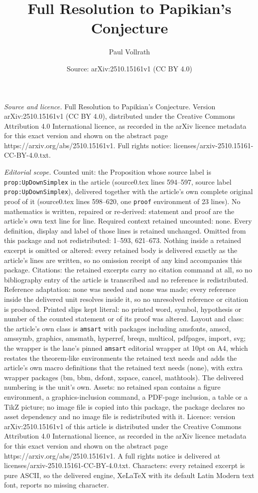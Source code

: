 \documentclass[10pt,a4paper]{amsart}
\title[Full Resolution to Papikian's Conjecture]{Full Resolution to Papikian's Conjecture}
\author{Paul Vollrath}
\date{Source: arXiv:2510.15161v1 (CC BY 4.0)}
\begin{document}
\maketitle

\noindent\emph{Source and licence.} Full Resolution to Papikian's Conjecture. Version arXiv:2510.15161v1 (CC BY 4.0), distributed under the Creative Commons Attribution 4.0 International licence, as recorded in the arXiv licence metadata for this exact version and shown on the abstract page https://arxiv.org/abs/2510.15161v1. Full rights notice: licenses/arxiv-2510.15161-CC-BY-4.0.txt.\par\smallskip

\noindent\textit{Editorial scope.} Counted unit: the Proposition whose source label is \texttt{prop:UpDownSimplex} in the article (source0.tex lines 594--597, source label \texttt{prop:UpDownSimplex}), delivered together with the article's own complete original proof of it (source0.tex lines 598--620, one \texttt{proof} environment of 23 lines). No mathematics is written, repaired or re-derived: statement and proof are the article's own text line for line. Required context retained uncounted: none. Every definition, display and label of those lines is retained unchanged. Omitted from this package and not redistributed: 1--593, 621--673. Nothing inside a retained excerpt is omitted or altered: every retained body is delivered exactly as the article's lines are written, so no omission receipt of any kind accompanies this package. Citations: the retained excerpts carry no citation command at all, so no bibliography entry of the article is transcribed and no reference is redistributed. Reference adaptation: none was needed and none was made; every reference inside the delivered unit resolves inside it, so no unresolved reference or citation is produced. Printed slips kept literal: no printed word, symbol, hypothesis or number of the counted statement or of its proof was altered. Layout and class: the article's own class is \texttt{amsart} with packages including amsfonts, amscd, amssymb, graphics, amsmath, hyperref, breqn, multicol, pdfpages, import, svg; the wrapper is the lane's pinned \texttt{amsart} editorial wrapper at 10pt on A4, which restates the theorem-like environments the retained text needs and adds the article's own macro definitions that the retained text needs (none), with extra wrapper packages (bm, bbm, dsfont, xspace, cancel, mathtools). The delivered numbering is the unit's own. Assets: no retained span contains a figure environment, a graphics-inclusion command, a PDF-page inclusion, a table or a TikZ picture; no image file is copied into this package, the package declares no asset dependency and no image file is redistributed with it. Licence: version arXiv:2510.15161v1 of this article is distributed under the Creative Commons Attribution 4.0 International licence, as recorded in the arXiv licence metadata for this exact version and shown on the abstract page https://arxiv.org/abs/2510.15161v1. A full rights notice is delivered at licenses/arxiv-2510.15161-CC-BY-4.0.txt. Characters: every retained excerpt is pure ASCII, so the delivered engine, XeLaTeX with its default Latin Modern text font, reports no missing character.
\end{document}
